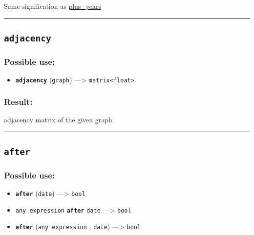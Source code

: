 \documentclass[]{book}
\providecommand{\tightlist}{%
  \setlength{\itemsep}{0pt}\setlength{\parskip}{0pt}}
\theoremstyle{definition}
\theoremstyle{definition}
\theoremstyle{definition}
\theoremstyle{remark}
\begin{document}
Same signification as \href{OperatorsNR\#plus_years}{plus\_years}

\begin{center}\rule{0.5\linewidth}{\linethickness}\end{center}

\subsection{\texorpdfstring{\texttt{adjacency}}{adjacency}}\label{adjacency}

\subsubsection{Possible use:}\label{possible-use-23}

\begin{itemize}
\tightlist
\item
  \textbf{\texttt{adjacency}} (\texttt{graph}) ---\textgreater{}
  \texttt{matrix\textless{}float\textgreater{}}
\end{itemize}

\subsubsection{Result:}\label{result-22}

adjacency matrix of the given graph.

\begin{center}\rule{0.5\linewidth}{\linethickness}\end{center}

\subsection{\texorpdfstring{\texttt{after}}{after}}\label{after}

\subsubsection{Possible use:}\label{possible-use-24}

\begin{itemize}
\tightlist
\item
  \textbf{\texttt{after}} (\texttt{date}) ---\textgreater{}
  \texttt{bool}
\item
  \texttt{any\ expression} \textbf{\texttt{after}} \texttt{date}
  ---\textgreater{} \texttt{bool}
\item
  \textbf{\texttt{after}} (\texttt{any\ expression} , \texttt{date})
  ---\textgreater{} \texttt{bool}
\end{itemize}
\end{document}
